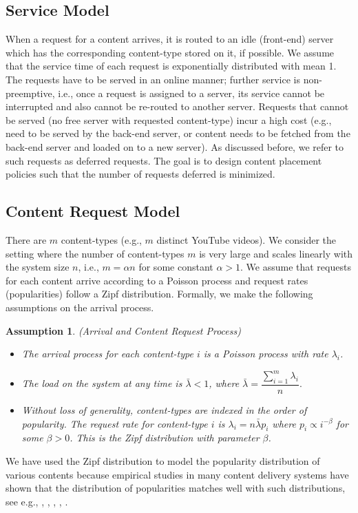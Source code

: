 \documentclass[10pt, conference, letterpaper]{IEEEtran}
\newtheorem{assumption}{Assumption}
\begin{document}
\subsection{Service Model}
When a request for a content arrives, it is routed to an idle
(front-end) server which has the corresponding content-type stored on
it, if possible. We assume that the service time of each request is
exponentially distributed with mean 1. The requests have to be served
in an online manner; further service is non-preemptive, i.e., once a
request is assigned to a server, its service cannot be interrupted and
also cannot be re-routed to another server. Requests that cannot be
served (no free server with requested content-type) incur a high cost
(e.g., need to be served by the back-end server, or content needs to
be fetched from the back-end server and loaded on to a new server). As
discussed before, we refer to such requests as deferred requests. The
goal is to design content placement policies such that the number of
requests deferred is minimized.

\subsection{Content Request Model}
There are $m$ content-types (e.g., $m$ distinct YouTube videos). We
consider the setting where the number of content-types $m$ is very
large and scales linearly with the system size $n$, i.e., $m = \alpha
n$ for some constant $\alpha>1$. We assume that requests for
each content arrive according to a Poisson process and request rates
(popularities) follow a Zipf distribution. Formally, we make the
following assumptions on the arrival process.
\begin{assumption}(Arrival and Content Request Process)
	\label{ass:zipf}
	\begin{itemize}
		\item[-] The arrival process for each content-type $i$ is a Poisson
		process with rate $\lambda_i$.
		
		\item[-] The load on the system at any time is $\bar{\lambda} < 1$, where
		$
		\bar{\lambda} = \dfrac{\sum_{i=1}^m \lambda_i}{n}.
		$
		
		\item[-] Without loss of generality, content-types are indexed in the
		order of popularity. The request rate for content-type $i$ is
		$\lambda_i = n \bar{\lambda}p_i$ where $p_i \propto i^{-\beta}$ for
		some $\beta> 0$. This is the Zipf distribution with parameter
		$\beta$.
		
		
	\end{itemize}
\end{assumption}
We have used the Zipf distribution to model the popularity
distribution of various contents because empirical studies in many
content delivery systems have shown that the distribution of
popularities matches well with such distributions, see e.g.,
\cite{Gill07}, \cite{BC99}, \cite{YZ06}, \cite{IRF04}, \cite{VA02}.
\end{document}
